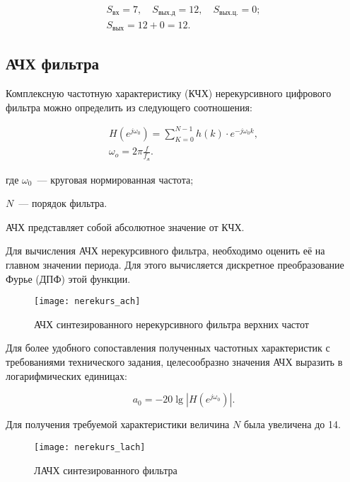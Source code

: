 \begin{gather*}
  S_{\text{вх}} = 7, \quad
  S_{\text{вых.д}} = 12,\quad
  S_{\text{вых.ц.}} = 0;\\
  S_{\text{вых}} = 12 + 0 = 12.
\end{gather*}

\subsection{АЧХ фильтра}

Комплексную частотную характеристику (КЧХ) нерекурсивного цифрового
фильтра можно определить из следующего соотношения:

\begin{gather*}
  H(e^{j\omega_0}) = \sum_{K=0}^{N-1}h(k) \cdot e^{-j\omega_0k},\\
  \omega_o = 2\pi\frac{f}{f_{\text{д}}}.
\end{gather*}

\begin{ESKDexplanation}
\item[где ] $\omega_0$~--- круговая нормированная частота;
\item $N$~--- порядок фильтра.
\end{ESKDexplanation}

АЧХ представляет собой абсолютное значение от КЧХ. 

Для вычисления АЧХ нерекурсивного фильтра, необходимо оценить её на
главном значении периода. Для этого вычисляется дискретное
преобразование Фурье (ДПФ) этой функции.

\begin{figure}[h!]
  \label{f:1}
  \texttt{[image: nerekurs\_ach]}
  \caption{АЧХ синтезированного нерекурсивного фильтра верхних частот}
\end{figure}

Для более удобного сопоставления полученных частотных характеристик с
требованиями технического задания, целесообразно значения АЧХ выразить
в логарифмических единицах:

\begin{equation*}
  a_0 = -20 \lg\left|H(e^{j \omega_0})\right|.
\end{equation*}

Для получения требуемой характеристики величина $N$ была увеличена до 14.

\begin{figure}[h!]
  \label{f:2}
  \texttt{[image: nerekurs\_lach]}
  \caption{ЛАЧХ синтезированного фильтра}
\end{figure}


